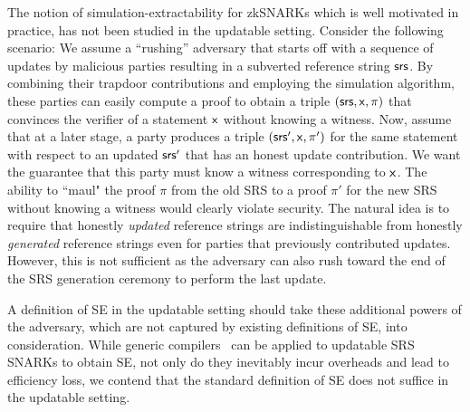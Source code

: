 The notion of simulation-extractability for zkSNARKs which is well motivated in practice, has not been studied in the updatable setting.
Consider the following scenario: We assume a ``rushing'' adversary that starts off with a sequence of updates by malicious parties resulting in a subverted reference string $\mathsf{srs}$. By combining their trapdoor contributions and employing the simulation algorithm, these parties can easily compute a proof to obtain a triple $(\mathsf{srs},\mathsf{x},\pi)$  that convinces the verifier of a statement $\mathsf{x}$ without knowing a witness. Now, assume that at a later stage, a party produces a triple $(\mathsf{srs}',\mathsf{x},\pi')$ for the same statement with respect to an updated $\mathsf{srs}'$ that has an honest update contribution. We want the guarantee that this party must know a witness corresponding to $\mathsf{x}$. The ability to ``maul" the proof $\pi$ from the old SRS to a proof $\pi'$ for the new SRS without knowing a witness would clearly violate security. The natural idea is to require that honestly \emph{updated} reference strings are indistinguishable from honestly \emph{generated} reference strings even for parties that previously contributed updates. However, this is not sufficient as the adversary can also rush toward the end of the SRS generation ceremony to perform the last update.


A definition of SE in the updatable setting should take these additional powers of the adversary, which are not captured by existing definitions of SE, into consideration.
While generic compilers~\cite{EPRINT:KZMQCP15,CCS:AbdRamSla20short} can be applied to updatable SRS SNARKs to obtain SE, not only do they inevitably incur overheads and lead to efficiency loss, we contend that the standard definition of SE does not suffice in the updatable setting.


